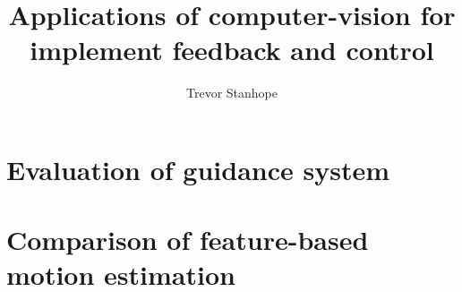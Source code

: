 \documentclass{report}
\begin{document}
\title{Applications of computer-vision for implement feedback and
  control}
\author{Trevor Stanhope}
\maketitle


\chapter{Evaluation of guidance system}

\chapter{Comparison of feature-based motion estimation}


\nocite{*}
\printbibliography
\end{document}
